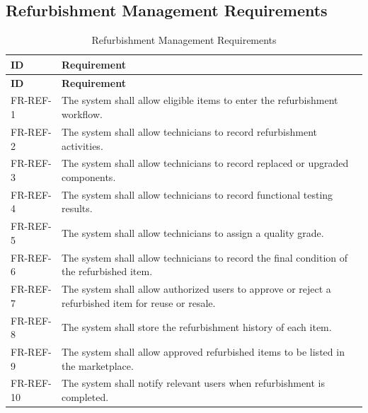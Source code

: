 \subsection{Refurbishment Management Requirements}
\begin{longtable}{@{}p{2.4cm}p{11cm}@{}}
\caption{Refurbishment Management Requirements} \label{tab:fr-ref} \\
\toprule \textbf{ID} & \textbf{Requirement} \\ \midrule
\endfirsthead
\toprule \textbf{ID} & \textbf{Requirement} \\ \midrule
\endhead
FR-REF-1 & The system shall allow eligible items to enter the refurbishment workflow. \\
FR-REF-2 & The system shall allow technicians to record refurbishment activities. \\
FR-REF-3 & The system shall allow technicians to record replaced or upgraded components. \\
FR-REF-4 & The system shall allow technicians to record functional testing results. \\
FR-REF-5 & The system shall allow technicians to assign a quality grade. \\
FR-REF-6 & The system shall allow technicians to record the final condition of the refurbished item. \\
FR-REF-7 & The system shall allow authorized users to approve or reject a refurbished item for reuse or resale. \\
FR-REF-8 & The system shall store the refurbishment history of each item. \\
FR-REF-9 & The system shall allow approved refurbished items to be listed in the marketplace. \\
FR-REF-10 & The system shall notify relevant users when refurbishment is completed. \\
\bottomrule
\end{longtable}

